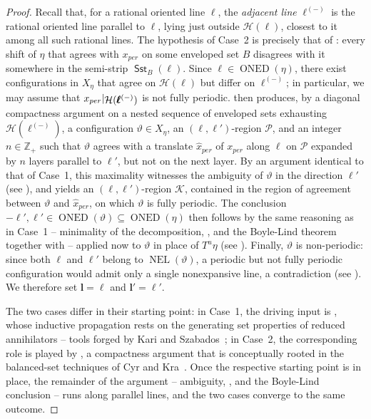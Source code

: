 \documentclass[12pt]{amsart}
\numberwithin{equation}{section}
\DeclareMathOperator{\nexpl}{NEL}
\DeclareMathOperator{\nexpd}{ONED}
\DeclareMathOperator{\sst}{\mathsf{Sst}}
\newcommand{\sob}[1]{\ensuremath{{\mathbin |}\raise-.4ex\hbox{$#1$}}}
\begin{document}
\begin{proof}
Recall that, for a rational oriented line $\pmb{\ell}$, the \emph{adjacent line} $\pmb{\ell}^{(-)}$ \cite[Definition~2.2]{Colle23}
is the rational oriented line parallel to $\pmb{\ell}$, lying just outside $\mathcal{H}(\pmb{\ell})$, closest to it among all such rational lines. The hypothesis of Case~2 is precisely that of \cite[Lemma~3.5]{Colle23}: every shift of $\eta$ that agrees with $ x_{per} $ on some enveloped set $ B $ disagrees with it somewhere in the semi-strip $\sst_B(\pmb{\ell})$. Since $\pmb{\ell} \in \nexpd(\eta)$, there exist configurations in $X_\eta$ that agree on $\mathcal H(\pmb{\ell})$ but differ on $\pmb{\ell}^{(-)}$; in particular, we may assume that $x_{per}\sob{\mathcal{H}(\pmb{\ell}^{(-)})}$ is not fully periodic. \cite[Lemma~3.5]{Colle23} then produces, by a diagonal compactness argument on a nested sequence of enveloped sets exhausting $ \mathcal H(\pmb{\ell}^{(-)}) $, a configuration $ \vartheta \in X_\eta $, an $(\pmb{\ell}, \pmb{\ell}')$-region $\mathcal P$, and an integer $n \in \mathbb{Z}_+$ such that $\vartheta$ agrees with a translate $\hat{x}_{per}$ of $x_{per}$ along $\pmb{\ell}$ on $\mathcal P$ expanded by $n$ layers parallel to $\pmb{\ell}'$, but not on the next layer. By an argument identical to that of Case~1, this maximality witnesses the ambiguity of $\vartheta$ in the direction $\pmb{\ell}'$ (see \cite[Claim~4.12]{Colle23}), and \cite[Lemma~4.2]{Colle23} yields an $(\pmb{\ell},\pmb{\ell}')$-region $\mathcal{K}$, contained in the region of agreement between $\vartheta$ and $\hat{x}_{per}$, on which $\vartheta$ is fully periodic. The conclusion $-\pmb{\ell}', \pmb{\ell}' \in \nexpd(\vartheta) \subseteq \nexpd(\eta)$ then follows by the same reasoning as in Case~1 -- minimality of the decomposition, \cite[Proposition~2.14]{Colle23}, and the Boyle-Lind theorem together with \cite[Proposition~1.3]{Colle23} -- applied now to $\vartheta$ in place of $T^u\eta$ (see \cite[Claims~4.13--4.14]{Colle23}). Finally, $ \vartheta $ is non-periodic: since both $\ell$ and $\ell'$ belong to $\nexpl(\vartheta)$, a periodic but not fully periodic configuration would admit only a single nonexpansive line, a contradiction (see \cite[Claim~4.15]{Colle23}). We therefore set $\pmb{l} = \pmb{\ell}$ and $\pmb{l}' = \pmb{\ell}'$.

\medskip

The two cases differ in their starting point: in Case~1, the driving input is \cite[Claim~4.7]{Colle23}, whose inductive propagation rests on the generating set properties of reduced annihilators -- tools forged by Kari and Szabados~\cite{KariSzabados20}; in Case~2, the corresponding role is played by \cite[Lemma~3.5]{Colle23}, a compactness argument that is conceptually rooted in the balanced-set techniques of Cyr and Kra~\cite{CyrKra15}. Once the respective starting point is in place, the remainder of the argument -- ambiguity, \cite[Lemma~4.2]{Colle23}, and the Boyle-Lind conclusion -- runs along parallel lines, and the two cases converge to the same outcome.


\end{proof}
\end{document}
